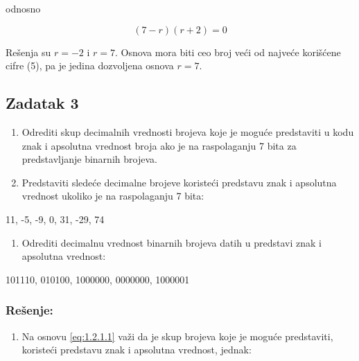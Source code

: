 \documentclass[a4paper,11pt]{article}
\numberwithin{equation}{section}
\begin{document}
odnosno



\begin{equation}\label{eq:2.2.4}
(7 - r)(r + 2) = 0
\end{equation}


Rešenja su $r=-2$ i $r=7$. Osnova mora biti ceo broj veći od najveće korišćene cifre (5), pa je jedina dozvoljena osnova $r=7$.

\FloatBarrier
\subsection{Zadatak 3}\label{sec:2.3}


\begin{enumerate}[label=\alph*),start=1,leftmargin=*]
\item Odrediti skup decimalnih vrednosti brojeva koje je moguće predstaviti u kodu znak i apsolutna vrednost broja ako je na raspolaganju 7 bita za predstavljanje binarnih brojeva.

\item Predstaviti sledeće decimalne brojeve koristeći predstavu znak i apsolutna vrednost ukoliko je na raspolaganju 7 bita:

\end{enumerate}


11, -5, -9, 0, 31, -29, 74



\begin{enumerate}[label=\alph*),start=3,leftmargin=*]
\item Odrediti decimalnu vrednost binarnih brojeva datih u predstavi znak i apsolutna vrednost:

\end{enumerate}


101110, 010100, 1000000, 0000000, 1000001



\subsubsection*{Rešenje:}


\begin{enumerate}[label=\alph*),start=1,leftmargin=*]
\item Na osnovu \eqref{eq:1.2.1.1} važi da je skup brojeva koje je moguće predstaviti, koristeći predstavu znak i apsolutna vrednost, jednak:

\end{enumerate}
\end{document}
